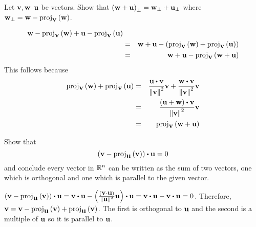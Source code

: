 \begin{enumialphparenastyle}
\begin{ex} \label{perp-linear} Let $\mbox{\bf v},\mbox{\bf w}$ $\mbox{\bf u}$ be vectors. Show
that $\left(\mbox{\bf w}+\mbox{\bf u}\right) _{\perp }=\mbox{\bf w}_{\perp }+\mbox{\bf u}_{\perp }$
 where $\mbox{\bf w}_{\perp }=\mbox{\bf w}-\mbox{\rm proj}_{\mbox{\bf v}}\left(\mbox{\bf w}\right)$.
\begin{sol}
\begin{eqnarray*}
\mbox{\bf w}-\mbox{\rm proj}_{\mbox{\bf v}}\left(\mbox{\bf w}\right) +\mbox{\bf u}- \mbox{\rm proj}_{\mbox{\bf v}}\left(\mbox{\bf u}\right) \\
&=&\mbox{\bf w}+\mbox{\bf u}-\left(\mbox{\rm proj}_{\mbox{\bf v}}\left(\mbox{\bf w}\right) +\mbox{\rm proj}_{\mbox{\bf v}}\left(\mbox{\bf u}\right) \right) \\
&=&\mbox{\bf w}+\mbox{\bf u}-\mbox{\rm proj}_{\mbox{\bf v}}\left(\mbox{\bf w}+\mbox{\bf u}\right) 
\end{eqnarray*}
This follows because 
\begin{eqnarray*}
\func{proj}_{\vect{v}}\tup{\vect{w}} +\func{proj}_{\vect{v}}\tup{
\vect{u}} &=& \frac{\vect{u}\dotprod \vect{v}}{\norm{\vect{v}} ^{2}}\vect{v}+
\frac{\vect{w}\dotprod \vect{v}}{\norm{\vect{v}} ^{2}}\vect{v} \\
&=& \frac{\tup{\vect{u}+\vect{w}} \dotprod \vect{v}}{\norm{\vect{v}
} ^{2}}\vect{v} \\
&=& \func{proj}_{\vect{v}}\tup{\vect{w}+\vect{u}}
\end{eqnarray*}
\end{sol}
\end{ex}

\begin{ex} Show that
\begin{equation*}
 \tup{\vect{v}-\func{proj}_{\vect{u}
}\tup{\vect{v}} } \dotprod \vect{u}=0
\end{equation*}
and conclude every vector in $\mathbb{R}^{n}$ can be written as the sum of
two vectors, one which is orthogonal and one which is parallel to the
given vector.
\begin{sol}
$\tup{\vect{v}-\func{proj}_{\vect{u}}\tup{\vect{v}} } \dotprod \vect{u} =  \vect{v} \dotprod \vect{u} -\tup{\frac{\tup{\vect{v}\cdot\vect{u}} }{\norm{\vect{u}} ^{2}}\vect{u} } \dotprod \vect{u} = \vect{v} \dotprod \vect{u} - \vect{v} \dotprod \vect{u} =0$. Therefore, $\mbox{\bf v} = \mbox{\bf v} - \mbox{\rm proj}_{\mbox{\bf u}}\left(\mbox{\bf v}\right) + \mbox{\rm proj}_{\mbox{\bf u}}\left(\mbox{\bf v}\right)$. The first is orthogonal to $\mbox{\bf u}$ and the second is a multiple
of $\mbox{\bf u}$ so it is parallel to $\mbox{\bf u}$.
\end{sol}
\end{ex}

\end{enumialphparenastyle}
